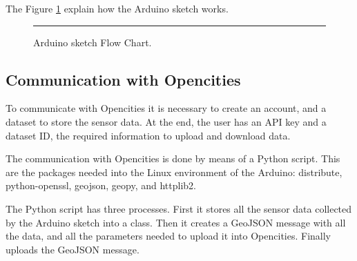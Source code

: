 \documentclass[12pt, a4paper,twoside]{tesi_upf}
\begin{document}
      The Figure \ref{fig:Arduino sketch Flow Chart} explain how the Arduino sketch works.\\
      
      \begin{figure}[htbp]
      \centering

      \rule{35em}{0.5pt}
      \caption[Arduino sketch Flow Chart]{Arduino sketch Flow Chart.}
      \label{fig:Arduino sketch Flow Chart}
      \end{figure}
    
    \subsection{Communication with Opencities}
    
      To communicate with Opencities it is necessary to create an account, and a dataset to store the sensor data. At the end, the user has an API key and a dataset ID, the required information to upload and download data. 
      
      The communication with Opencities is done by means of a Python script. This are the packages needed into the Linux environment of the Arduino: distribute, python-openssl, geojson, geopy, and httplib2.
      
      The Python script has three processes. First it stores all the sensor data collected by the Arduino sketch into a class. Then it creates a GeoJSON message with all the data, and all the parameters needed to upload it into Opencities. Finally uploads the GeoJSON message.
      
\end{document}
